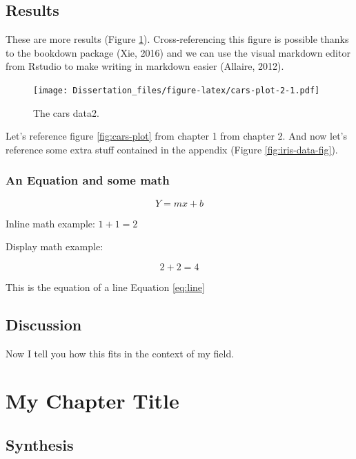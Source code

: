 \documentclass[
  10pt,
]{report}
\begin{document}
\hypertarget{results-1}{%
\section{Results}\label{results-1}}

These are more results (Figure \ref{fig:cars-plot-2}). Cross-referencing this figure is possible thanks to the bookdown package (Xie, 2016) and we can use the visual markdown editor from Rstudio to make writing in markdown easier (Allaire, 2012).

\begin{figure}
\centering
\texttt{[image: Dissertation\_files/figure-latex/cars-plot-2-1.pdf]}
\caption{\label{fig:cars-plot-2}The cars data2.}
\end{figure}

Let's reference figure \ref{fig:cars-plot} from chapter 1 from chapter 2. And now let's reference some extra stuff contained in the appendix (Figure \ref{fig:iris-data-fig}).

\hypertarget{an-equation-and-some-math}{%
\subsection{An Equation and some math}\label{an-equation-and-some-math}}

\begin{equation}
  Y=mx+b 
  \label{eq:line}
\end{equation}

Inline math example: \(1+1=2\)

Display math example:

\[
2+2=4
\]

This is the equation of a line Equation \eqref{eq:line}

\hypertarget{discussion-1}{%
\section{Discussion}\label{discussion-1}}

Now I tell you how this fits in the context of my field.

\hypertarget{my-chapter-title-1}{%
\chapter{My Chapter Title}\label{my-chapter-title-1}}

\hypertarget{synthesis}{%
\section{Synthesis}\label{synthesis}}
\end{document}
